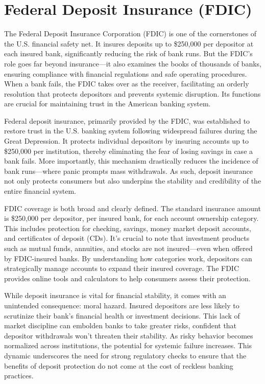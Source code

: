 \section{Federal Deposit Insurance (FDIC)}

The Federal Deposit Insurance Corporation (FDIC) is one of the cornerstones of the U.S. financial safety net. It insures deposits up to \$250,000 per depositor at each insured bank, significantly reducing the risk of bank runs. But the FDIC's role goes far beyond insurance—it also examines the books of thousands of banks, ensuring compliance with financial regulations and safe operating procedures. When a bank fails, the FDIC takes over as the receiver, facilitating an orderly resolution that protects depositors and prevents systemic disruption. Its functions are crucial for maintaining trust in the American banking system.

Federal deposit insurance, primarily provided by the FDIC, was established to restore trust in the U.S. banking system following widespread failures during the Great Depression. It protects individual depositors by insuring accounts up to \$250,000 per institution, thereby eliminating the fear of losing savings in case a bank fails. More importantly, this mechanism drastically reduces the incidence of bank runs—where panic prompts mass withdrawals. As such, deposit insurance not only protects consumers but also underpins the stability and credibility of the entire financial system.

FDIC coverage is both broad and clearly defined. The standard insurance amount is \$250,000 per depositor, per insured bank, for each account ownership category. This includes protection for checking, savings, money market deposit accounts, and certificates of deposit (CDs). It’s crucial to note that investment products such as mutual funds, annuities, and stocks are not insured—even when offered by FDIC-insured banks. By understanding how categories work, depositors can strategically manage accounts to expand their insured coverage. The FDIC provides online tools and calculators to help consumers assess their protection.

While deposit insurance is vital for financial stability, it comes with an unintended consequence: moral hazard. Insured depositors are less likely to scrutinize their bank’s financial health or investment decisions. This lack of market discipline can embolden banks to take greater risks, confident that depositor withdrawals won’t threaten their stability. As risky behavior becomes normalized across institutions, the potential for systemic failure increases. This dynamic underscores the need for strong regulatory checks to ensure that the benefits of deposit protection do not come at the cost of reckless banking practices.

